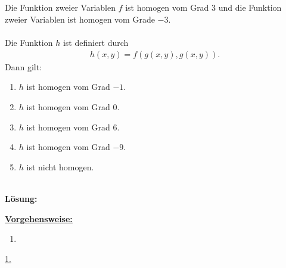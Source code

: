 \subsection*{}
Die Funktion zweier Variablen $ f $ ist homogen vom Grad $ 3 $ und die Funktion zweier Variablen ist homogen vom Grade $ -3 $.\\
\\
Die Funktion $ h $ ist definiert durch
\begin{align*}
	h(x,y) = f(g(x,y),g(x,y)).
\end{align*}
Dann gilt:
\renewcommand{\labelenumi}{(\alph{enumi})}
\begin{enumerate}
	\item 
	$ h $ ist homogen vom Grad $ -1 $. 
	\item
	$ h $ ist homogen vom Grad $ 0 $. 
	\item
	$ h $ ist homogen vom Grad $ 6 $. 
	\item
	$ h $ ist homogen vom Grad $ -9 $.  
	\item
	$ h $ ist nicht homogen.
\end{enumerate}
\ \\
\textbf{Lösung:}
\begin{mdframed}
	\underline{\textbf{Vorgehensweise:}}
	\renewcommand{\labelenumi}{\theenumi.}
	\begin{enumerate}
		\item 
	\end{enumerate}
\end{mdframed}

\underline{1. }\\